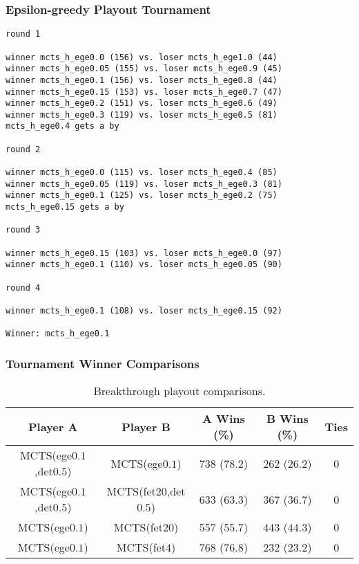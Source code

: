 \documentclass{article}
\begin{document}
\subsubsection{Epsilon-greedy Playout Tournament}

\begin{verbatim}
round 1

winner mcts_h_ege0.0 (156) vs. loser mcts_h_ege1.0 (44)
winner mcts_h_ege0.05 (155) vs. loser mcts_h_ege0.9 (45)
winner mcts_h_ege0.1 (156) vs. loser mcts_h_ege0.8 (44)
winner mcts_h_ege0.15 (153) vs. loser mcts_h_ege0.7 (47)
winner mcts_h_ege0.2 (151) vs. loser mcts_h_ege0.6 (49)
winner mcts_h_ege0.3 (119) vs. loser mcts_h_ege0.5 (81)
mcts_h_ege0.4 gets a by

round 2

winner mcts_h_ege0.0 (115) vs. loser mcts_h_ege0.4 (85)
winner mcts_h_ege0.05 (119) vs. loser mcts_h_ege0.3 (81)
winner mcts_h_ege0.1 (125) vs. loser mcts_h_ege0.2 (75)
mcts_h_ege0.15 gets a by

round 3

winner mcts_h_ege0.15 (103) vs. loser mcts_h_ege0.0 (97)
winner mcts_h_ege0.1 (110) vs. loser mcts_h_ege0.05 (90)

round 4

winner mcts_h_ege0.1 (108) vs. loser mcts_h_ege0.15 (92)

Winner: mcts_h_ege0.1
\end{verbatim}

\subsubsection{Tournament Winner Comparisons}

\begin{table}[h!]
\begin{center}
\begin{tabular}{|c|c|ccc|}
\hline
Player A & Player B                             & A Wins (\%)  & B Wins (\%)  & Ties \\ 
\hline
MCTS(ege$0.1$,det$0.5$) & MCTS(ege$0.1$)        & 738 (78.2)   & 262 (26.2)   & 0    \\
MCTS(ege$0.1$,det$0.5$) & MCTS(fet$20$,det$0.5$) & 633 (63.3)   & 367 (36.7)   & 0    \\
MCTS(ege$0.1$)          & MCTS(fet$20$)          & 557 (55.7)   & 443 (44.3)   & 0    \\
MCTS(ege$0.1$)          & MCTS(fet$4$)           & 768 (76.8)   & 232 (23.2)   & 0    \\
\hline
\end{tabular}
\end{center}
\caption{Breakthrough playout comparisons.}
\end{table}
\end{document}

